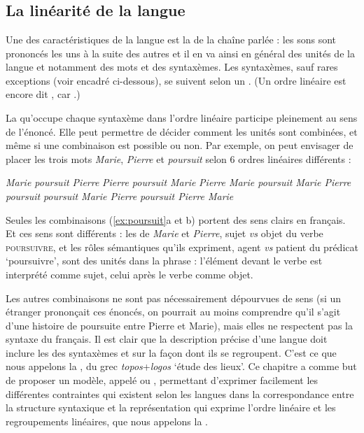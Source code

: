 \chapter{}\label{sec:3.5}

\section{La linéarité de la langue}\label{sec:3.5.0}

Une des caractéristiques de la langue est la  de la chaîne parlée : les sons sont prononcés les uns à la suite des autres et il en va ainsi en général des unités de la langue et notamment des mots et des syntaxèmes. Les syntaxèmes, sauf rares exceptions (voir encadré ci-dessous), se suivent selon un . (Un ordre linéaire est encore dit , car .)

La  qu’occupe chaque syntaxème dans l’ordre linéaire participe pleinement au sens de l’énoncé. Elle peut permettre de décider comment les unités sont combinées, et même si une combinaison est possible ou non. Par exemple, on peut envisager de placer les trois mots \textit{Marie}, \textit{Pierre} et \textit{poursuit} selon 6 ordres linéaires différents :

\ea\label{ex:poursuit}
\ea \textit{Marie poursuit Pierre}
\ex \textit{Pierre poursuit Marie}
\ex \textit{Pierre Marie poursuit}
\ex \textit{Marie Pierre poursuit}
\ex \textit{poursuit Marie Pierre}
\ex \textit{poursuit Pierre Marie}
\z
\z

Seules les combinaisons (\ref{ex:poursuit}a et b) portent des sens clairs en français. Et ces sens sont différents : les  de \textit{Marie} et \textit{Pierre}, sujet \textit{vs} objet du verbe \textsc{poursuivre}, et les rôles sémantiques qu’ils expriment, agent \textit{vs} patient du prédicat ‘poursuivre’, sont  des unités dans la phrase : l’élément devant le verbe est interprété comme sujet, celui après le verbe comme objet.

Les autres combinaisons ne sont pas nécessairement dépourvues de sens (si un étranger prononçait ces énoncés, on pourrait au moins comprendre qu’il s’agit d’une histoire de poursuite entre Pierre et Marie), mais elles ne respectent pas la syntaxe du français. Il est clair que la description précise d’une langue doit inclure les  des syntaxèmes et sur la façon dont ils se regroupent. C’est ce que nous appelons la , du grec \textit{topos}+\textit{logos} ‘étude des lieux’. Ce chapitre a comme but de proposer un modèle, appelé  ou , permettant d’exprimer facilement les différentes contraintes qui existent selon les langues dans la correspondance entre la structure syntaxique et la représentation qui exprime l’ordre linéaire et les regroupements linéaires, que nous appelons la .

